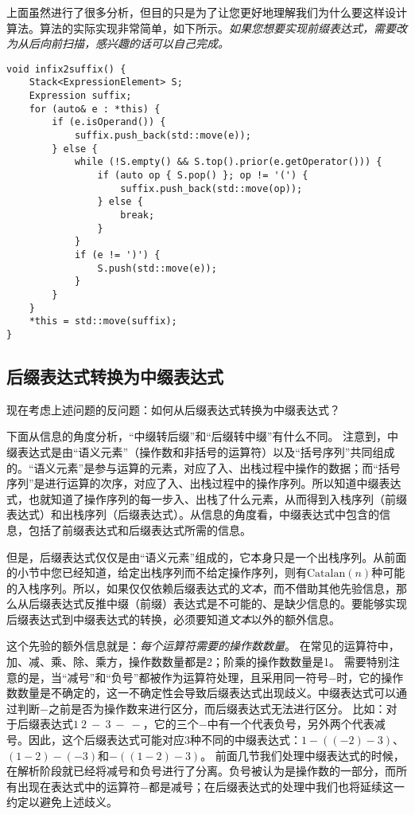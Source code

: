 上面虽然进行了很多分析，但目的只是为了让您更好地理解我们为什么要这样设计算法。算法的实际实现非常简单，如下所示。\textit{如果您想要实现前缀表达式，需要改为从后向前扫描，感兴趣的话可以自己完成。}

\begin{lstlisting}
void infix2suffix() {
    Stack<ExpressionElement> S;
    Expression suffix;
    for (auto& e : *this) {
        if (e.isOperand()) {
            suffix.push_back(std::move(e));
        } else {
            while (!S.empty() && S.top().prior(e.getOperator())) {
                if (auto op { S.pop() }; op != '(') {
                    suffix.push_back(std::move(op));
                } else {
                    break;
                }
            }
            if (e != ')') {
                S.push(std::move(e));
            }
        }
    }
    *this = std::move(suffix);
}
\end{lstlisting}

\subsection{后缀表达式转换为中缀表达式}

现在考虑上述问题的反问题：如何从后缀表达式转换为中缀表达式？

下面从信息的角度分析，“中缀转后缀”和“后缀转中缀”有什么不同。
注意到，中缀表达式是由“语义元素”（操作数和非括号的运算符）以及“括号序列”共同组成的。“语义元素”是参与运算的元素，对应了入、出栈过程中操作的数据；而“括号序列”是进行运算的次序，对应了入、出栈过程中的操作序列。所以知道中缀表达式，也就知道了操作序列的每一步入、出栈了什么元素，从而得到入栈序列（前缀表达式）和出栈序列（后缀表达式）。从信息的角度看，中缀表达式中包含的信息，包括了前缀表达式和后缀表达式所需的信息。

但是，后缀表达式仅仅是由“语义元素”组成的，它本身只是一个出栈序列。从前面的小节中您已经知道，给定出栈序列而不给定操作序列，则有$\mathrm{Catalan}(n)$种可能的入栈序列。所以，如果仅仅依赖后缀表达式的\textit{文本}，而不借助其他先验信息，那么从后缀表达式反推中缀（前缀）表达式是不可能的、是缺少信息的。要能够实现后缀表达式到中缀表达式的转换，必须要知道\textit{文本}以外的额外信息。

这个先验的额外信息就是：\textit{每个运算符需要的操作数数量}。
在常见的运算符中，加、减、乘、除、乘方，操作数数量都是2；阶乘的操作数数量是1。
需要特别注意的是，当“减号”和“负号”都被作为运算符处理，且采用同一符号$-$时，它的操作数数量是不确定的，这一不确定性会导致后缀表达式出现歧义。中缀表达式可以通过判断$-$之前是否为操作数来进行区分，而后缀表达式无法进行区分。
比如：对于后缀表达式$1\ 2\ -\ 3\ -\ -$，它的三个$-$中有一个代表负号，另外两个代表减号。因此，这个后缀表达式可能对应3种不同的中缀表达式：$1-((-2)-3)$、$(1-2)-(-3)$和$-((1-2)-3)$。
前面几节我们处理中缀表达式的时候，在解析阶段就已经将减号和负号进行了分离。负号被认为是操作数的一部分，而所有出现在表达式中的运算符$-$都是减号；在后缀表达式的处理中我们也将延续这一约定以避免上述歧义。

